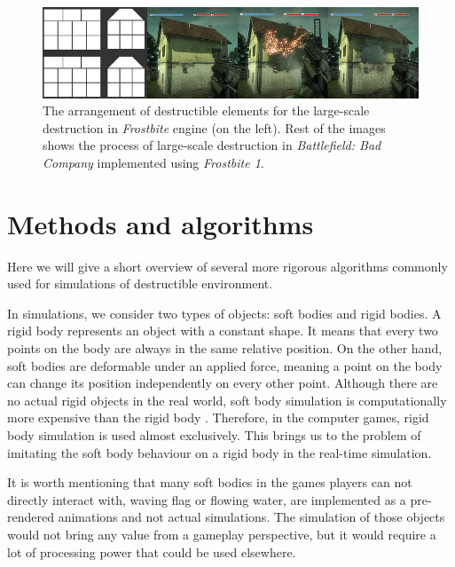 \begin{figure}
\centering
\includegraphics[width=\textwidth]{img/frostbite}
\caption{The arrangement of destructible elements for the large-scale destruction in \emph{Frostbite} engine (on the left). Rest of the images shows the process of large-scale destruction in \emph{Battlefield: Bad Company} implemented using \emph{Frostbite 1}.}\label{fig:frostbite}
\end{figure}


\section{Methods and algorithms}

Here we will give a short overview of several more rigorous algorithms commonly used for simulations of destructible environment. 

In simulations, we consider two types of objects: soft bodies and rigid bodies. A rigid body represents an object with a constant shape. It means  that every two points on the body are always in the same relative position. On the other hand, soft bodies are deformable under an applied force, meaning a point on the body can change its position independently on every other point. Although there are no actual rigid objects in the real world, soft body simulation is computationally more expensive than the rigid body . Therefore, in the computer games, rigid body simulation is used almost exclusively. This brings us to the problem of imitating the soft body behaviour on a rigid body in the real-time simulation. 

It is worth mentioning that many soft bodies in the games players can not directly interact with, \eg waving flag or flowing water, are implemented as a pre-rendered animations and not actual simulations. The simulation of those objects would not bring any value from a gameplay perspective, but it would require a lot of processing power that could be used elsewhere. 

